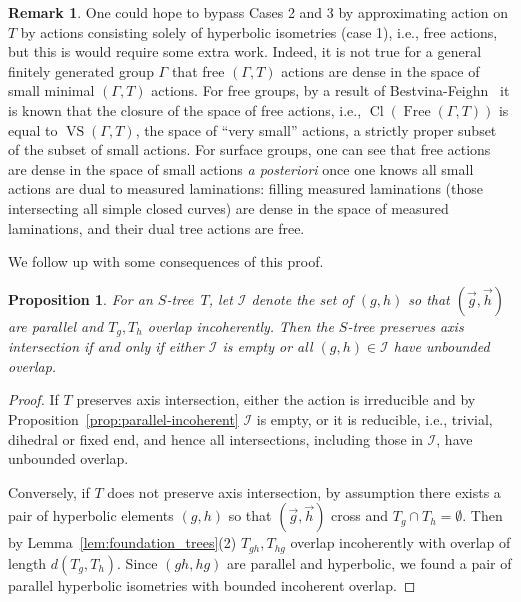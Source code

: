 \documentclass[11pt]{amsart}
\newcommand{\ora}[1]{\overrightarrow{#1}}
\numberwithin{equation}{section}
\numberwithin{figure}{section}
\newtheorem{proposition}[theorem]{Proposition}
\theoremstyle{definition}
\newtheorem{remark}[theorem]{Remark}
\theoremstyle{plain}
\begin{document}
\begin{remark}
One could hope to bypass Cases 2 and 3 by approximating action on $T$ by actions consisting solely of hyperbolic isometries (case 1), i.e., free actions, but this is would require some extra work.
Indeed, it is not true for a general finitely generated group $\Gamma$
that free $(\Gamma,T)$ actions are dense in the space of small minimal
$(\Gamma,T)$ actions. For free groups, by a result of
Bestvina-Feighn~\cite{BF11:OuterLimits} it is known that the closure
of the space of free actions, i.e.,
$\operatorname{Cl}(\operatorname{Free}(\Gamma, T))$ is equal to
$\operatorname{VS}(\Gamma,T)$, the space of ``very small'' actions, a
strictly proper subset of the subset of small actions. For surface
groups, one can see that free actions are dense in the space of small
actions \emph{a posteriori} once one knows all small actions are dual
to measured laminations: filling measured laminations (those
intersecting all simple closed curves) are dense in the space of
measured laminations, and their dual tree actions are free.
\end{remark}

We follow up with some consequences of this proof.

\begin{proposition}
  For an $S$-tree~$T$,
  let $\mathcal{I}$ denote the set of $(g,h)$ so that
  $(\ora{g},\ora{h})$ are parallel and $T_g,T_h$ overlap incoherently.
 Then the $S$-tree preserves axis intersection if and only if either $\mathcal{I}$ is empty or all $(g,h) \in \mathcal{I}$ have unbounded overlap.
 \label{prop:preserves_axis}
\end{proposition}
\begin{proof}
If $T$ preserves axis intersection, either
the action is irreducible and by Proposition~\ref{prop:parallel-incoherent}
$\mathcal{I}$ is
empty, or it is reducible, i.e., trivial, dihedral or fixed end, and hence all intersections, including those in
$\mathcal{I}$, have unbounded overlap.

Conversely, if $T$ does not preserve axis intersection, by assumption
there exists a pair of hyperbolic elements
$(g,h)$ so that $(\ora{g},\ora{h})$ cross and $T_g \cap T_h =
\emptyset$. Then by Lemma~\ref{lem:foundation_trees}(2)
$T_{gh},T_{hg}$ overlap incoherently with overlap of length
$d(T_g,T_h)$. Since $(gh,hg)$ are parallel and hyperbolic, we
found a pair of parallel hyperbolic isometries with bounded incoherent
overlap.
\end{proof}
\end{document}
